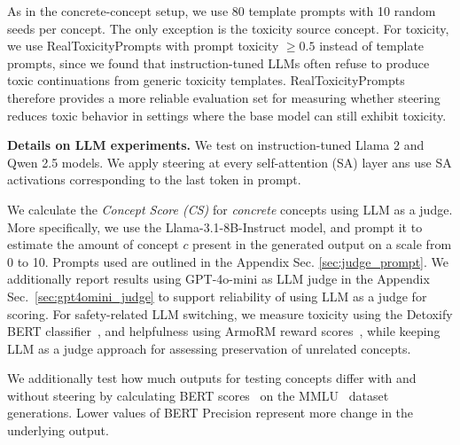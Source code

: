 As in the concrete-concept setup, we use 80 template prompts with 10 random seeds per concept. The only exception is the toxicity source concept. For toxicity, we use RealToxicityPrompts with prompt toxicity $\ge 0.5$ instead of template prompts, since we found that instruction-tuned LLMs often refuse to produce toxic continuations from generic toxicity templates. RealToxicityPrompts therefore provides a more reliable evaluation set for measuring whether steering reduces toxic behavior in settings where the base model can still exhibit toxicity.

\noindent \textbf{Details on LLM experiments.}
\label{sec:experiment_setup_llm}
We test on instruction-tuned Llama 2 \cite{touvron2023llama2openfoundation} and Qwen 2.5 \cite{DBLP:journals/corr/abs-2412-15115} models. We apply steering at every self-attention (SA) layer ans use SA activations corresponding to the last token in prompt.
%

We calculate the \emph{Concept Score (CS)} for \textit{concrete} concepts using LLM as a judge. More specifically, we use the Llama-3.1-8B-Instruct \cite{DBLP:journals/corr/abs-2407-21783} model, and prompt it to estimate the amount of concept $c$ present in the generated output on a scale from 0 to 10. Prompts used are outlined in the Appendix Sec. \ref{sec:judge_prompt}. We additionally report results using GPT-4o-mini as LLM judge in the Appendix Sec.~\ref{sec:gpt4omini_judge} to support reliability of using LLM as a judge for scoring.
% 
For safety-related LLM switching, we measure toxicity using the Detoxify BERT classifier~\cite{Detoxify}, and helpfulness using ArmoRM reward scores~\cite{armorm}, while keeping LLM as a judge approach for assessing preservation of unrelated concepts. 
 
We additionally test how much outputs for testing concepts differ with and without steering by calculating BERT scores~\cite{DBLP:conf/iclr/ZhangKWWA20} on the MMLU~\cite{DBLP:conf/iclr/HendrycksBBZMSS21} dataset generations. Lower values of BERT Precision represent more change in the underlying output.


